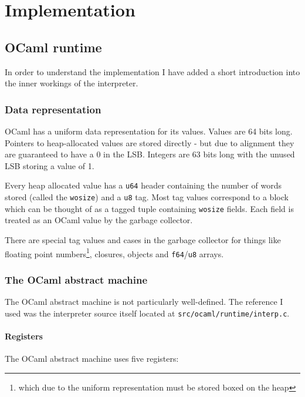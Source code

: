 \chapter{Implementation}

\section{OCaml runtime}

In order to understand the implementation I have added a short introduction into the inner workings
of the interpreter.

\subsection{Data representation}

OCaml has a uniform data representation for its values. Values are 64 bits long. Pointers to
heap-allocated values are
stored directly - but due to alignment they are guaranteed to have a 0 in the LSB. Integers are 63
bits long
with the unused LSB storing a value of 1.

Every heap allocated value has a \texttt{u64} header containing the number of words stored (called
the \texttt{wosize}) and a \texttt{u8} tag. Most tag values correspond to a block which can be
thought of as a tagged tuple containing \texttt{wosize} fields. Each field is treated as an OCaml
value by the garbage collector.

There are special tag values and cases in the garbage collector for things like floating point
numbers\footnote{which due to the uniform representation must be stored boxed on the heap},
closures, objects and \texttt{f64}/\texttt{u8} arrays.

\subsection{The OCaml abstract machine}

The OCaml abstract machine is not particularly well-defined. The reference I used was the
interpreter source itself located at \texttt{src/ocaml/runtime/interp.c}.

\subsubsection{Registers}

The OCaml abstract machine uses five registers:

